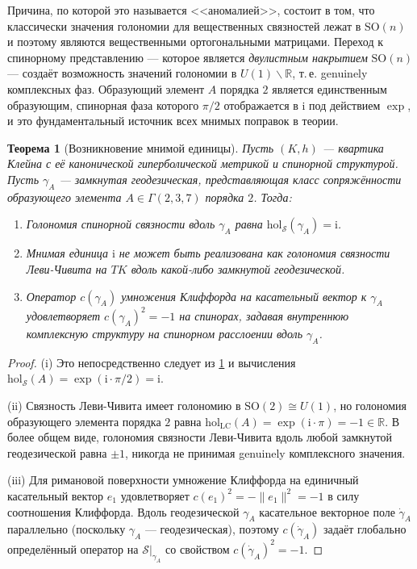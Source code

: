\documentclass[12pt,a4paper]{article}
\newtheorem{theorem}{Теорема}[section]
\theoremstyle{definition}
\theoremstyle{remark}
\newcommand{\RR}{\mathbb{R}}
\newcommand{\SO}{\mathrm{SO}}
\newcommand{\hol}{\mathrm{hol}}
\newcommand{\LC}{\mathrm{LC}}
\newcommand{\cS}{\mathcal{S}}
\newcommand{\ii}{\mathrm{i}}
\begin{document}
Причина, по которой это называется <<аномалией>>, состоит в том, что классически значения голономии для вещественных связностей лежат в $\SO(n)$ и поэтому являются вещественными ортогональными матрицами. Переход к спинорному представлению --- которое является \emph{двулистным накрытием} $\SO(n)$ --- создаёт возможность значений голономии в $U(1) \smallsetminus \RR$, т.\,е. genuinely комплексных фаз. Образующий элемент $A$ порядка $2$ является единственным образующим, спинорная фаза которого $\pi/2$ отображается в $\ii$ под действием $\exp$, и это фундаментальный источник всех мнимых поправок в теории.

\begin{theorem}[Возникновение мнимой единицы]
\label{thm:imaginary}
Пусть $(K, h)$ --- квартика Клейна с её канонической гиперболической метрикой и спинорной структурой. Пусть $\gamma_A$ --- замкнутая геодезическая, представляющая класс сопряжённости образующего элемента $A \in \Gamma(2,3,7)$ порядка $2$. Тогда:
\begin{enumerate}[label=(\roman*)]
\item Голономия спинорной связности вдоль $\gamma_A$ равна $\hol_{\cS}(\gamma_A) = \ii$.
\item Мнимая единица $\ii$ не может быть реализована как голономия связности Леви-Чивита на $TK$ вдоль какой-либо замкнутой геодезической.
\item Оператор $c(\gamma_A)$ умножения Клиффорда на касательный вектор к $\gamma_A$ удовлетворяет $c(\gamma_A)^2 = -1$ на спинорах, задавая внутреннюю комплексную структуру на спинорном расслоении вдоль $\gamma_A$.
\end{enumerate}
\end{theorem}

\begin{proof}
(i) Это непосредственно следует из \cref{thm:imaginary} и вычисления $\hol_{\cS}(A) = \exp(\ii \cdot \pi/2) = \ii$.

(ii) Связность Леви-Чивита имеет голономию в $\SO(2) \cong U(1)$, но голономия образующего элемента порядка $2$ равна $\hol_{\LC}(A) = \exp(\ii \cdot \pi) = -1 \in \RR$. В более общем виде, голономия связности Леви-Чивита вдоль любой замкнутой геодезической равна $\pm 1$, никогда не принимая genuinely комплексного значения.

(iii) Для римановой поверхности умножение Клиффорда на единичный касательный вектор $e_1$ удовлетворяет $c(e_1)^2 = -\|e_1\|^2 = -1$ в силу соотношения Клиффорда. Вдоль геодезической $\gamma_A$ касательное векторное поле $\dot{\gamma}_A$ параллельно (поскольку $\gamma_A$ --- геодезическая), поэтому $c(\dot{\gamma}_A)$ задаёт глобально определённый оператор на $\cS|_{\gamma_A}$ со свойством $c(\dot{\gamma}_A)^2 = -1$.
\end{proof}
\end{document}
